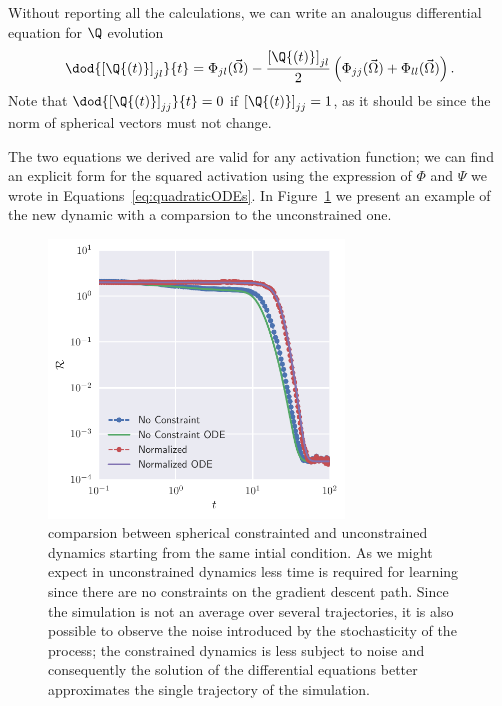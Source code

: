 Without reporting all the calculations, we can write an analougus differential equation for \(\Q\) evolution
\begin{equation} \label{eq:genericsphericalQ}
  \dod{\left[\Q{\left(t\right)}\right]_{jl}}{t} = \Phi_{jl}{(\vec{\Omega})} - \frac{\left[\Q{\left(t\right)}\right]_{jl}}{2}\left(\Phi_{jj}{(\vec{\Omega})}+\Phi_{ll}{(\vec{\Omega})}\right).
\end{equation}
Note that \(\dod{\left[\Q{\left(t\right)}\right]_{jj}}{t}=0\) if \(\left[\Q{\left(t\right)}\right]_{jj}=1\),
as it should be since the norm of spherical vectors must not change.

The two equations we derived are valid for any activation function; we can find an explicit form for the squared activation using
the expression of \(\Phi\) and \(\Psi\) we wrote in Equations~\eqref{eq:quadraticODEs}.
In Figure~\ref{fig:example-spherical} we present an example of the new dynamic
with a comparsion to the unconstrained one.
\begin{figure}
  \centering
  \includegraphics[width=0.7\textwidth]{figures/example-spherical.pdf}
  \caption{
    comparsion between spherical constrainted and unconstrained dynamics starting from the same intial condition.
    As we might expect in unconstrained dynamics less time is required for learning since
    there are no constraints on the gradient descent path.
    Since the simulation is not an average over several trajectories,
    it is also possible to observe the noise introduced by the stochasticity of the process;
    the constrained dynamics is less subject to noise and consequently the solution of the differential equations
    better approximates the single trajectory of the simulation.
  }
  \label{fig:example-spherical}
\end{figure}

